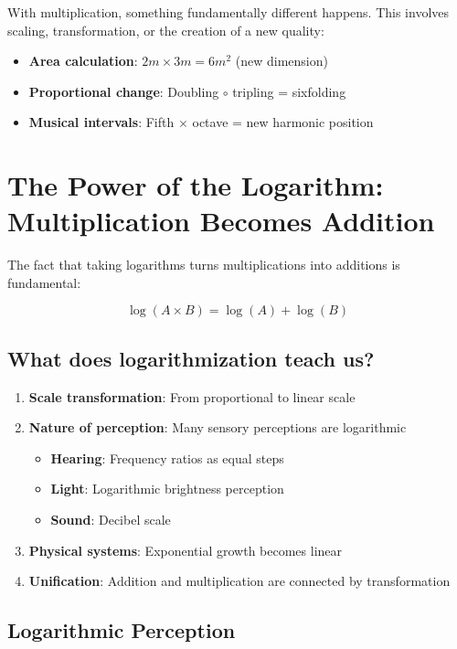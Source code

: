 \documentclass[11pt,a4paper]{article}
\begin{document}
	With multiplication, something fundamentally different happens. This involves scaling, transformation, or the creation of a new quality:
	
	\begin{itemize}
		\item \textbf{Area calculation}: $2m \times 3m = 6m^2$ (new dimension)
		\item \textbf{Proportional change}: Doubling $\circ$ tripling = sixfolding
		\item \textbf{Musical intervals}: Fifth $\times$ octave = new harmonic position
	\end{itemize}
	
	\section{The Power of the Logarithm: Multiplication Becomes Addition}
	
	The fact that taking logarithms turns multiplications into additions is fundamental:
	
	\begin{equation}
		\log(A \times B) = \log(A) + \log(B)
	\end{equation}
	
	\subsection{What does logarithmization teach us?}
	
	\begin{enumerate}
		\item \textbf{Scale transformation}: From proportional to linear scale
		\item \textbf{Nature of perception}: Many sensory perceptions are logarithmic
		\begin{itemize}
			\item \textbf{Hearing}: Frequency ratios as equal steps
			\item \textbf{Light}: Logarithmic brightness perception
			\item \textbf{Sound}: Decibel scale
		\end{itemize}
		\item \textbf{Physical systems}: Exponential growth becomes linear
		\item \textbf{Unification}: Addition and multiplication are connected by transformation
	\end{enumerate}
	
	\subsection{Logarithmic Perception}
	
\end{document}
